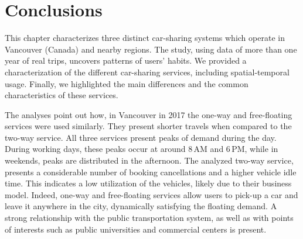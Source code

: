 \section{Conclusions} 
\label{sec:4_6_conclusion}

This chapter characterizes three distinct car-sharing systems which operate in  Vancouver  (Canada)  and nearby regions. The study, using data of more than one year of real trips, uncovers patterns of users’ habits. We provided a characterization of the different car-sharing services, including spatial-temporal usage. Finally, we highlighted the main differences and the common characteristics of these services.

The analyses point out how, in Vancouver in 2017 the one-way and free-floating services were used similarly. They present shorter travels when compared to the two-way service. All three services present peaks of demand during the day. During working days, these peaks occur at around 8\,AM and 6\,PM, while in weekends, peaks are distributed in the afternoon. The analyzed two-way service, presents a considerable number of booking cancellations and a higher vehicle idle time. This indicates a low utilization of the vehicles, likely due to their business model. Indeed, one-way and free-floating services allow users to pick-up a car and leave it anywhere in the city, dynamically satisfying the floating demand. 
A strong relationship with the public transportation system, as well as with points of interests such as public universities and commercial centers is present. 